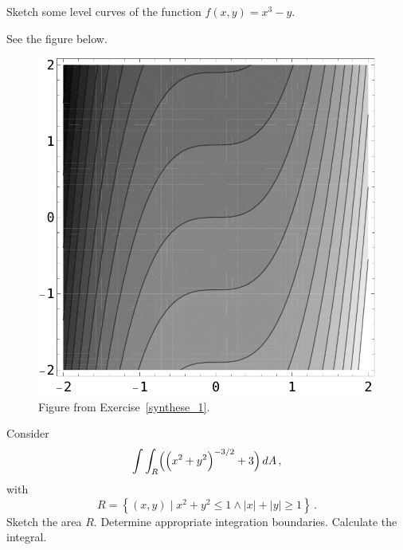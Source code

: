 \begin{Exercise}[label=synthese_1] Sketch some level curves of the function $f(x,y)=x^3-y$.
\end{Exercise}

\begin{Answer}
See the figure below. 
\begin{figure}[H]
    \centerline{
   \includegraphics[scale=0.5]{fig_synthese_1}
    }
    \caption{Figure from Exercise~\ref{synthese_1}.}
    \end{figure}
\end{Answer}


\begin{Exercise}[label=synthese_2] Consider 
$$
\int\int_R\Bigl(\left(x^2+y^2\right)^{-3/2}+3\Bigr)\,dA\,,
$$
with 
$$
R=\left\{(x,y)\mid x^2+y^2\leq1\wedge |x|+|y|\geq1\right\}\,.
$$
\Question Sketch the area $R$. 
    \Question Determine appropriate integration boundaries.
    \Question Calculate the integral.
\end{Exercise}

